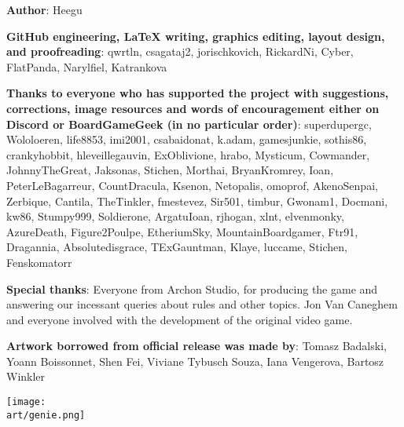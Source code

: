 
\bigbreak

\begin{multicols*}{2}

\textbf{Author}: Heegu\par
\textbf{GitHub engineering, LaTeX writing, graphics editing, layout design, and proofreading}: qwrtln, csagataj2, jorischkovich, RickardNi, Cyber, FlatPanda, Narylfiel, Katrankova\par
\textbf{Thanks to everyone who has supported the project with suggestions, corrections, image resources and words of encouragement either on Discord or BoardGameGeek (in no particular order)}: superdupergc, Wololoeren, life8853, imi2001, csabaidonat, k.adam, gamesjunkie, sothis86, cranky\textunderscore hobbit, hleveillegauvin, ExOblivione, hrabo, Mysticum, Cowmander, JohnnyTheGreat, Jaksonas, Stichen, Morthai, BryanKromrey, Ioan, PeterLeBagarreur, \textunderscore Count\textunderscore Dracula\textunderscore , \space Ksenon, Netopalis, omoprof, AkenoSenpai, Zerbique, Cantila, TheTinkler, fmestevez, Sir501, timbur, Gwonam1, Docmani, kw86, Stumpy999, Soldierone, Argatu\textunderscore Ioan, rj\textunderscore hogan, xlnt, elvenmonky, AzureDeath, Figure2Poulpe, EtheriumSky, MountainBoardgamer, Ftr91, Dragannia, Absolutedisgrace, TExGauntman, Klaye, luccame, Stichen, Fenskomatorr
\par

\textbf{Special thanks}: Everyone from Archon Studio, for producing the game and answering our incessant queries about rules and other topics.
Jon Van Caneghem and everyone involved with the development of the original video game.\par
\textbf{Artwork borrowed from official release was made by}: Tomasz Badalski, Yoann Boissonnet, Shen Fei, Viviane Tybusch Souza, Iana Vengerova, Bartosz Winkler

\columnbreak

\vspace*{\fill}

\texttt{[image: \\art/genie.png]}

\vspace*{\fill}

\end{multicols*}
